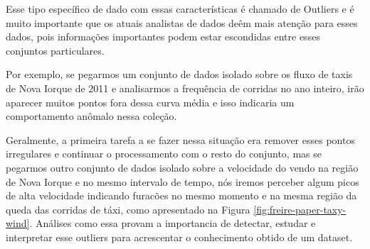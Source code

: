 
Esse tipo específico de dado com essas características é chamado de Outliers e é muito importante que os atuais analistas de dados deêm mais atenção para esses dados, pois informações importantes podem estar escondidas entre esses conjuntos particulares.


Por exemplo, se pegarmos um conjunto de dados isolado sobre os fluxo de taxis de Nova Iorque de 2011 e analisarmos a frequência de corridas no ano inteiro, irão aparecer muitos pontos fora dessa curva média e isso indicaria um comportamento anômalo nessa coleção.


Geralmente, a primeira tarefa a se fazer nessa situação era remover esses pontos irregulares e continuar o processamento com o resto do conjunto, mas se pegarmos outro conjunto de dados isolado sobre a velocidade do vendo na região de Nova Iorque e no mesmo intervalo de tempo, nós iremos perceber algum picos de alta velocidade indicando furacões no mesmo momento e na mesma região da queda das corridas de táxi, como apresentado na Figura \ref{fig:freire-paper-taxy-wind}. Análises como essa provam a importancia de detectar, estudar e interpretar esse outliers para acrescentar o conhecimento obtido de um dataset.



